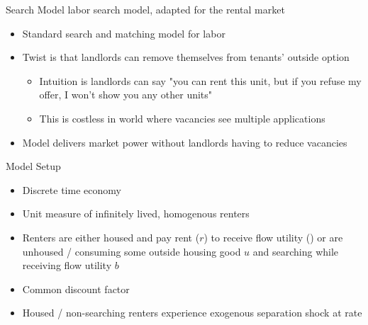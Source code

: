 \documentclass[10pt, xcolor=dvipsnames]{beamer}
\begin{document}
\begin{frame}{Search Model}
\cite{jarosh-search-2024} labor search model, adapted for the rental market 
    \begin{itemize}
        \item Standard search and matching model for labor
        \item Twist is that landlords can remove themselves from tenants' outside option
        \begin{itemize}
            \item Intuition is landlords can say "you can rent this unit, but if you refuse my offer, I won't show you any other units"
            \item This is costless in world where vacancies see multiple applications
        \end{itemize}
        \item Model delivers market power without landlords having to reduce vacancies
    \end{itemize}
\end{frame}

\begin{frame}{Model Setup}
    \begin{itemize}
    \item Discrete time economy
    \item Unit measure of infinitely lived, homogenous renters
    \item Renters are either housed and pay rent ($r$) to receive flow utility (\boldsymbol{$\eta$}) or are unhoused / consuming some outside housing good \textbf{$u$} and searching while receiving flow utility \textbf{$b$}
    \item Common discount factor 
    \item Housed / non-searching renters experience exogenous separation shock at rate \boldsymbol{$\delta$}
\end{itemize}
\end{frame}
\end{document}
